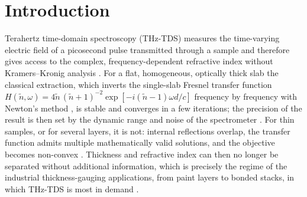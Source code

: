 \documentclass{optica-article}
\begin{document}
\begin{abstract}
\end{abstract}

\section{Introduction}
Terahertz time-domain spectroscopy (THz-TDS) measures the time-varying electric field of a picosecond pulse transmitted through a sample and therefore gives access to the complex, frequency-dependent refractive index without Kramers--Kronig analysis \cite{Grischkowsky1990,Duvillaret1996,Dorney2001,Pupeza2007,Naftaly2007,Neu2018}. For a flat, homogeneous, optically thick slab the classical extraction, which inverts the single-slab Fresnel transfer function $H(\tilde n,\omega)=4\tilde n\,(\tilde n+1)^{-2}\exp[-i(\tilde n-1)\omega d/c]$ frequency by frequency with Newton's method \cite{Duvillaret1996,Duvillaret1999,Withayachumnankul2014}, is stable and converges in a few iterations; the precision of the result is then set by the dynamic range and noise of the spectrometer \cite{Jepsen2005,Withayachumnankul2008,Naftaly2009}. For thin samples, or for several layers, it is not: internal reflections overlap, the transfer function admits multiple mathematically valid solutions, and the objective becomes non-convex \cite{Scheller2009,Scheller2014,Zhang2024}. Thickness and refractive index can then no longer be separated without additional information, which is precisely the regime of the industrial thickness-gauging applications, from paint layers to bonded stacks, in which THz-TDS is most in demand \cite{Yasui2005,Krimi2016,Naftaly2019}.
\end{document}
